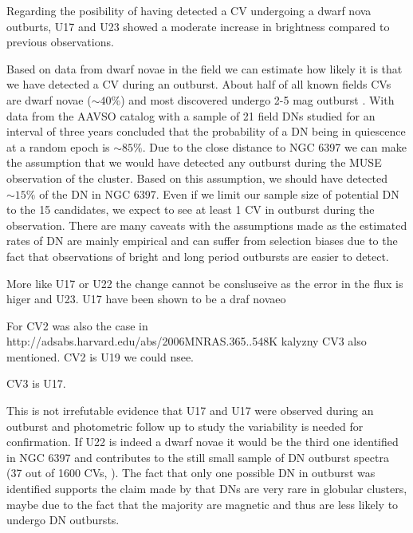  Regarding the posibility of having detected a CV undergoing a dwarf nova outburts, U17 and U23 showed a moderate increase in brightness compared to previous observations. 
 
 
 Based on data from dwarf novae in the field we can estimate how likely it is that we have detected a CV during an outburst. About half of all known fields CVs are dwarf novae ($\sim 40 \%$) and most discovered undergo 2-5 mag outburst \citep{2001PASP..113..764D,warner_cataclysmic_2003}. With data from the AAVSO catalog with a sample of 21 field DNs studied for an interval of three years \cite{Szkody_21DN_1984} concluded that the probability of a DN being in quiescence at a random epoch is $\sim 85 \%$. Due to the close distance to NGC 6397 we can make the assumption that we would have detected any outburst during the MUSE observation of the cluster. Based on this assumption, we should have detected $\sim 15 \%$ of the DN in NGC 6397. Even if we limit our sample size of potential DN to the 15 candidates, we expect to see at least 1 CV in outburst during the observation. There are many caveats with the assumptions made as the estimated rates of DN are mainly empirical and can suffer from selection biases due to the fact that observations of bright and long period outbursts are easier to detect. 



More like U17 or U22 the change cannot be consluseive as the error in the flux is higer and U23. U17 have been shown to be a draf novaeo

For CV2 was also the case in http://adsabs.harvard.edu/abs/2006MNRAS.365..548K kalyzny CV3 also mentioned. CV2 is U19 we could nsee. 

CV3 is U17.  

This is not irrefutable evidence that U17 and U17  were observed during an outburst and photometric follow up to study the variability is needed for confirmation. If U22 is indeed a dwarf novae it would be the third one identified in NGC 6397 \citep{shara_erupting_2005} and contributes to the still small sample of DN outburst spectra (37 out of 1600 CVs, \citealt{2001PASP..113..764D}). The fact that only one possible DN in outburst was identified supports the claim made by \cite{shara_CVsDN_1996} that DNs are very rare in globular clusters, maybe due to the fact that the majority are magnetic and thus are less likely to undergo DN outbursts. \\ 

